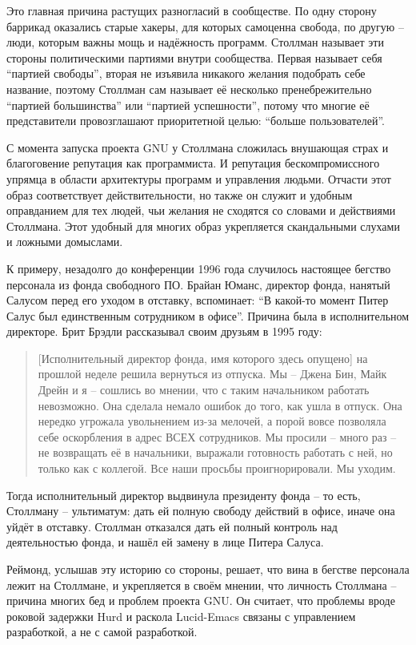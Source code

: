 Это главная причина растущих разногласий в сообществе. По одну сторону баррикад оказались старые хакеры, для которых самоценна свобода, по другую -- люди, которым важны мощь и надёжность программ. Столлман называет эти стороны политическими партиями внутри сообщества. Первая называет себя \enquote{партией свободы}, вторая не изъявила никакого желания подобрать себе название, поэтому Столлман сам называет её несколько пренебрежительно \enquote{партией большинства} или \enquote{партией успешности}, потому что многие её представители провозглашают приоритетной целью: \enquote{больше пользователей}.

С момента запуска проекта GNU у Столлмана сложилась внушающая страх и благоговение репутация как программиста. И репутация бескомпромиссного упрямца в области архитектуры программ и управления людьми. Отчасти этот образ соответствует действительности, но также он служит и удобным оправданием для тех людей, чьи желания не сходятся со словами и действиями Столлмана. Этот удобный для многих образ укрепляется скандальными слухами и ложными домыслами.

К примеру, незадолго до конференции 1996 года случилось настоящее бегство персонала из фонда свободного ПО. Брайан Юманс, директор фонда, нанятый Салусом перед его уходом в отставку, вспоминает: \enquote{В какой-то момент Питер Салус был единственным сотрудником в офисе}. Причина была в исполнительном директоре. Брит Брэдли рассказывал своим друзьям в 1995 году:

\begin{quote}
[Исполнительный директор фонда, имя которого здесь опущено] на прошлой неделе решила вернуться из отпуска. Мы -- Джена Бин, Майк Дрейн и я -- сошлись во мнении, что с таким начальником работать невозможно. Она сделала немало ошибок до того, как ушла в отпуск. Она нередко угрожала увольнением из-за мелочей, а порой вовсе позволяла себе оскорбления в адрес ВСЕХ сотрудников. Мы просили -- много раз -- не возвращать её в начальники, выражали готовность работать с ней, но только как с коллегой. Все наши просьбы проигнорировали. Мы уходим.
\end{quote}

Тогда исполнительный директор выдвинула президенту фонда -- то есть, Столлману -- ультиматум: дать ей полную свободу действий в офисе, иначе она уйдёт в отставку. Столлман отказался дать ей полный контроль над деятельностью фонда, и нашёл ей замену в лице Питера Салуса.

Реймонд, услышав эту историю со стороны, решает, что вина в бегстве персонала лежит на Столлмане, и укрепляется в своём мнении, что личность Столлмана -- причина многих бед и проблем проекта GNU. Он считает, что проблемы вроде роковой задержки Hurd и раскола Lucid-Emacs связаны с управлением разработкой, а не с самой разработкой.

